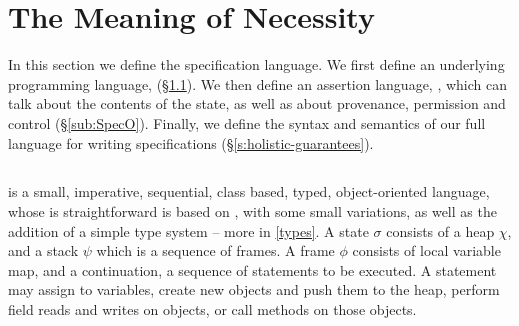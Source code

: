 \section{The Meaning of Necessity}
\label{s:semantics}

 
In this section we define {the}  \Nec specification language.  
We first define an underlying programming language, \Loo (\S \ref{sub:Loo}).
We then define an assertion language, \SpecO, which can talk about the
contents of the state, as well as about provenance, permission and
control (\S \ref{sub:SpecO}).  Finally, we define the syntax and
semantics of our full language for writing \Nec
specifications (\S \ref{s:holistic-guarantees}).


\subsection{\Loo}
\label{sub:Loo} 
 \Loo is a  {small}, imperative, sequential, 
class based, typed, object-oriented language, whose
\Loo is straightforward
\Loo is based on \LangOO 
\cite{FASE}, with some small variations, as well as 
the addition of  %
 a simple type system -- more in \ref{types}.
%
%
A \Loo state $\sigma$ consists of a 
heap $\chi$, and a  {stack $\psi$ which is a sequence of frames}.
A frame $\phi$ consists of
local variable map, and a continuation, \ie a sequence of statements to be executed.
 A statement may assign to variables, create new objects and push them to the heap, 
perform field reads and writes on objects,  or
 call methods on those objects. 

